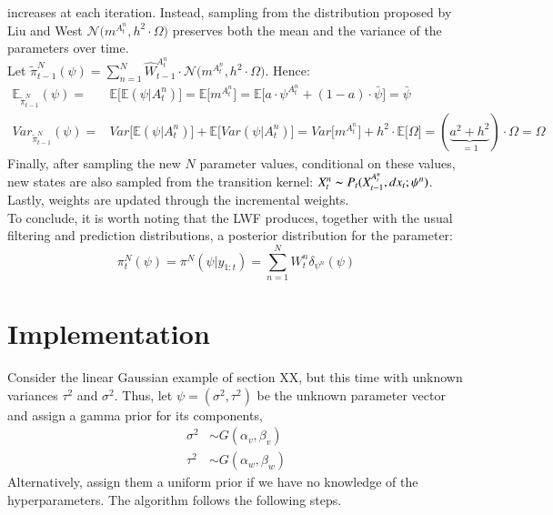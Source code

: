\documentclass[
]{book}
\theoremstyle{break}
\theoremstyle{nonumberplain}
\begin{document}
increases at each iteration. Instead, sampling from the distribution
proposed by Liu and West
\(\mathcal N\big(m^{A_t^n},h^2\cdot \Omega\big)\) preserves both the
mean and the variance of the parameters over time.\\
Let
\(\tilde \pi_{t-1}^N(\psi)=\sum_{n=1}^N \hat W_{t-1}^{A_t^{n}}\cdot \mathcal N\big(m^{A_t^n},h^2\cdot \Omega\big)\).
Hence: \begin{equation*}
    \begin{split}
        \mathbb E_{\tilde \pi_{t-1}^N} ( \psi)=& \mathbb E\big[\mathbb E( \psi|A_t^{n})\big]=\mathbb E\big[m^{A_t^n}\big]=\mathbb E\big[a\cdot \psi^{A_t^n}+(1-a)\cdot \bar \psi\big]=\bar \psi\\
        Var_{\tilde \pi_{t-1}^N} ( \psi)=&Var\big[\mathbb E( \psi|A_t^{n})\big]+\mathbb E\big[Var( \psi|A_t^{n})\big]=Var\big[m^{A_t^n}\big]+h^2\cdot\mathbb E\big[\Omega\big]=(\underbrace{a^2+h^2}_{=1})\cdot \Omega =\Omega
    \end{split}
\end{equation*} Finally, after sampling the new \(N\) parameter values,
conditional on these values, new states are also sampled from the
transition kernel: \(X_t^n\thicksim P_t(X_{t-1}^{A_t^n},dx_t; \psi^n)\).
Lastly, weights are updated through the incremental weights.~\\
To conclude, it is worth noting that the LWF produces, together with the
usual filtering and prediction distributions, a posterior distribution
for the parameter: \begin{equation}
    \pi^N_{t}(\psi)=\pi^N(\psi|y_{1:t})=\sum_{n=1}^NW_{t}^n\delta_{\psi^n}(\psi)
\end{equation}

\section{Implementation}

\hfill\break
Consider the linear Gaussian example of section XX, but this time with
unknown variances \(\tau^{2}\) and \(\sigma^{2}\). Thus, let
\(\psi=(\sigma^{2},\tau^{2})\) be the unknown parameter vector and
assign a gamma prior for its components, \begin{align*}
\sigma^{2}  & \sim G(\alpha_{v},\beta_{v}) \\
\tau^{2}  & \sim G(\alpha_{w},\beta_{w})
\end{align*} Alternatively, assign them a uniform prior if we have no
knowledge of the hyperparameters. The algorithm follows the following
steps.
\end{document}
